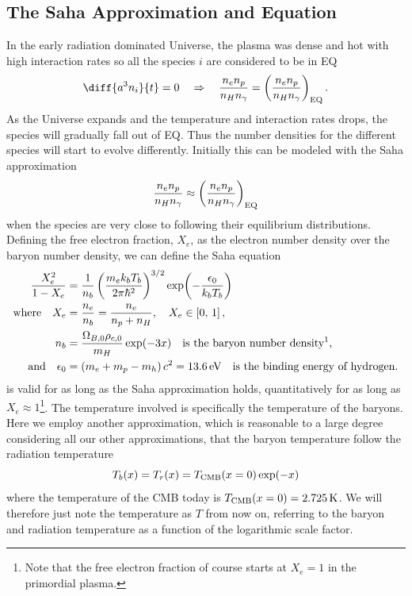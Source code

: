\documentclass[10pt,a4paper]{article}
\begin{document}
\subsection{The Saha Approximation and Equation}
\label{subsubsec:THeory/Saha approximation and equation}
In the early radiation dominated Universe, the plasma was dense and hot with high interaction rates so all the species $i$ are considered to be in EQ
\begin{equation*}
    \diff{a^3n_i}{t} = 0 \quad \Rightarrow \quad \frac{n_e n_p}{n_H n_\gamma} = \left(\frac{n_e n_p}{n_H n_\gamma}\right)_{\rm{EQ}}.
\end{equation*}
As the Universe expands and the temperature and interaction rates drops, the species will gradually fall out of EQ. Thus the number densities for the different species will start to evolve differently. Initially this can be modeled with the Saha approximation
\begin{equation}
    \frac{n_e n_p}{n_H n_\gamma} \approx \left(\frac{n_e n_p}{n_H n_\gamma}\right)_{\rm{EQ}}
    \label{eq:Saha approximation}
\end{equation}
when the species are very close to following their equilibrium distributions. Defining the free electron fraction, $X_e$, as the electron number density over the baryon number density, we can define the Saha equation
\begin{align}
    \frac{X_e^2}{1-X_e} &= \frac{1}{n_b}\left(\frac{m_e k_b T_b}{2\pi \hbar^2}\right)^{3/2} \exp(-\frac{\epsilon_0}{k_b T_b}) \label{eq:Saha equation}
    \\
    \text{where} \quad X_e &= \frac{n_e}{n_b} = \frac{n_e}{n_p+n_H}, \quad X_e \in \left[0,\, 1\right], \label{eq:Free electron fraction}
    \\
    n_b &= \frac{\Omega_{B,0} \rho_{c,0}}{m_H}\exp(-3x) \quad \text{is the baryon number density\footnotemark,} \label{eq:baryon number density}
    \\
    \text{and} \quad \epsilon_0 &= \left(m_e + m_p - m_h\right)c^2 = \SI{13.6}{eV} \quad \text{is the binding energy of hydrogen.} \notag
\end{align}
%
 is valid for as long as the Saha approximation holds, quantitatively for as long as $X_e \approx 1$\footnote{Note that the free electron fraction of course starts at $X_e=1$ in the primordial plasma.}. The temperature involved is specifically the temperature of the baryons. Here we employ another approximation, which is reasonable to a large degree considering all our other approximations, that the baryon temperature follow the radiation temperature
\begin{equation}
    T_b(x) = T_r(x) = T_{\rm{CMB}}(x=0)\exp(-x)
\end{equation}
where the temperature of the CMB today is $T_{\rm{CMB}}(x=0) = \SI{2.725}{K}$. We will therefore just note the temperature as $T$ from now on, referring to the baryon and radiation temperature as a function of the logarithmic scale factor.
\end{document}
